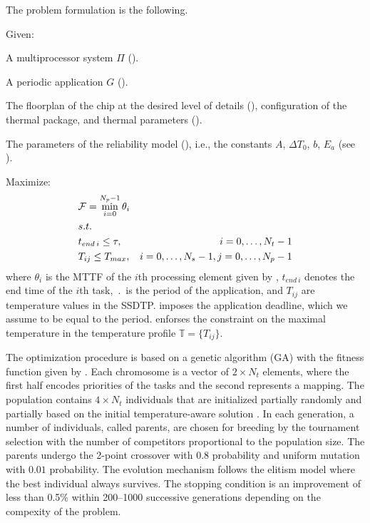 The problem formulation is the following.

Given:
\begin{ilist}
  \item A multiprocessor system $\Pi$ ().
  \item A periodic application $G$ ().
  \item The floorplan of the chip at the desired level of details (), configuration of the thermal package, and thermal parameters ().
  \item The parameters of the reliability model (), i.e., the constants $A$, $\Delta T_0$, $b$, $E_a$ (see ).
\end{ilist}

Maximize:
\begin{align}
  & \mathcal{F} = \min_{i = 0}^{N_p - 1} \theta_i \label{eq:fitness-function} \\
  & s.t. \nonumber \\
  & t_{end \: i} \leq \tau, & i = 0, \dots, N_t - 1 \label{eq:deadline} \\
  & T_{ij} \leq T_{max},       & i = 0, \dots, N_s - 1, j = 0, \dots, N_p - 1 \label{eq:t-max}
\end{align}
where $\theta_i$ is the MTTF of the $i$th processing element given by , $t_{end \: i}$ denotes the end time of the $i$th task, $\period$ is the period of the application, and $T_{ij}$ are temperature values in the SSDTP.  imposes the application deadline, which we assume to be equal to the period.  enforses the constraint on the maximal temperature in the temperature profile $\mathbb{T} = \{ T_{ij} \}$.

The optimization procedure is based on a genetic algorithm (GA) \cite{schmitz2004} with the fitness function given by . Each chromosome is a vector of $2 \times N_t$ elements, where the first half encodes priorities of the tasks and the second represents a mapping. The population contains $4 \times N_t$ individuals that are initialized partially randomly and partially based on the initial temperature-aware solution \cite{xie2006}. In each generation, a number of individuals, called parents, are chosen for breeding by the tournament selection with the number of competitors proportional to the population size. The parents undergo the 2-point crossover with $0.8$ probability and uniform mutation with $0.01$ probability. The evolution mechanism follows the elitism model where the best individual always survives. The stopping condition is an improvement of less than 0.5\% within 200--1000 successive generations depending on the compexity of the problem.

